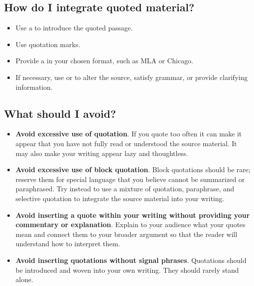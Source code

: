 \subsection{How do I integrate quoted material?}

 \begin{itemize}
\item Use a \hyperlink{signalphrase}{\color{Ahrenge}{signal phrase}} to introduce the quoted passage.

\item Use quotation marks.

\item Provide a \hyperlink{citation}{\color{Ahrenge}{citation}} in your chosen format, such as MLA or Chicago.

\item If necessary, use \hyperlink{ellipsis}{\color{Ahrenge}{ellipsis}} or \hyperlink{brackets}{\color{Ahrenge}{brackets}} to alter the source,
satisfy grammar, or provide clarifying information.

\end{itemize}


\subsection{What should I avoid?}

\begin{itemize}
\item \textbf{Avoid excessive use of quotation}. If you quote too often it can
make it appear that you have not fully read or understood the source material.
It may also make your writing appear lazy and thoughtless.

\item \textbf{Avoid excessive use of block quotation}. Block quotations should
be rare; reserve them for special language that you believe cannot be
summarized or paraphrased. Try instead to use a mixture of quotation, paraphrase, and selective quotation to integrate the source material into your writing. 

\item \textbf{Avoid inserting a quote within your writing without providing
your commentary or explanation}. Explain to your audience what your quotes mean and connect them to your broader argument so that the reader will understand how to interpret them.

\item \textbf{Avoid inserting quotations without signal phrases}. Quotations
should be introduced and woven into your own writing. They should rarely stand alone.

\end{itemize}

